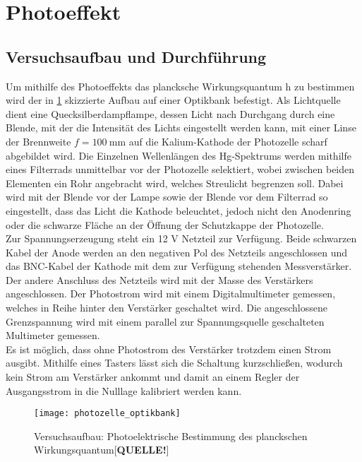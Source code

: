 \section{Photoeffekt}
\subsection{Versuchsaufbau und Durchführung}
Um mithilfe des Photoeffekts das plancksche Wirkungsquantum h zu bestimmen wird der 
in \cref{fig:photozelle_optikbank} skizzierte Aufbau auf einer Optikbank befestigt.
Als Lichtquelle dient eine Quecksilberdampflampe, dessen Licht nach Durchgang durch eine
Blende, mit der die Intensität des Lichts eingestellt werden kann, 
mit einer Linse der Brennweite $f=\SI{100}{\milli\meter}$ auf die Kalium-Kathode 
der Photozelle scharf abgebildet wird. Die Einzelnen Wellenlängen des Hg-Spektrums 
werden mithilfe eines Filterrads unmittelbar vor der Photozelle selektiert,
wobei zwischen beiden Elementen ein Rohr angebracht wird, welches Streulicht 
begrenzen soll. Dabei wird mit der Blende vor der Lampe sowie der Blende vor 
dem Filterrad so eingestellt, dass das Licht die Kathode beleuchtet, jedoch nicht 
den Anodenring oder die schwarze Fläche an der Öffnung der Schutzkappe der Photozelle.\\

Zur Spannungserzeugung steht ein 12 V Netzteil zur Verfügung. Beide schwarzen 
Kabel der Anode werden an den negativen Pol des Netzteils angeschlossen und 
das BNC-Kabel der Kathode mit dem zur Verfügung stehenden Messverstärker.
Der andere Anschluss des Netzteils wird mit der Masse des Verstärkers angeschlossen.
Der Photostrom wird mit einem Digitalmultimeter gemessen, welches in Reihe hinter 
den Verstärker geschaltet wird.
Die angeschlossene Grenzspannung wird mit einem parallel zur Spannungsquelle 
geschalteten Multimeter gemessen.\\

Es ist möglich, dass ohne Photostrom des Verstärker trotzdem einen Strom ausgibt.
Mithilfe eines Tasters lässt sich die Schaltung kurzschließen, wodurch kein Strom
am Verstärker ankommt und damit an einem Regler der Ausgangsstrom in die Nulllage
kalibriert werden kann.



\begin{figure}[htb]
    \centering
    \texttt{[image: photozelle\_optikbank]}
    \caption{Versuchsaufbau: Photoelektrische Bestimmung des planckschen Wirkungsquantum[\textbf{QUELLE!}]}
    \label{fig:photozelle_optikbank}
\end{figure}